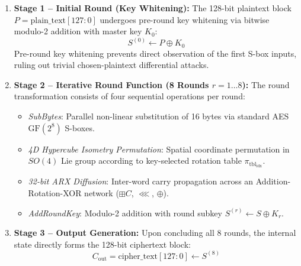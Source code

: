 \documentclass[10pt,twocolumn]{article}
\begin{document}
\begin{enumerate}
    \item \textbf{Stage 1 -- Initial Round (Key Whitening):} The 128-bit plaintext block $P = \text{plain\_text}[127:0]$ undergoes pre-round key whitening via bitwise modulo-2 addition with master key $K_0$:
    \begin{equation}
        S^{(0)} \leftarrow P \oplus K_0
    \end{equation}
    Pre-round key whitening prevents direct observation of the first S-box inputs, ruling out trivial chosen-plaintext differential attacks.
    
    \item \textbf{Stage 2 -- Iterative Round Function (8 Rounds $r = 1 \dots 8$):} The round transformation consists of four sequential operations per round:
    \begin{itemize}
        \item \emph{SubBytes}: Parallel non-linear substitution of 16 bytes via standard AES $\text{GF}(2^8)$ S-boxes.
        \item \emph{4D Hypercube Isometry Permutation}: Spatial coordinate permutation in $SO(4)$ Lie group according to key-selected rotation table $\pi_{\text{tbl}_{\text{idx}}}$.
        \item \emph{32-bit ARX Diffusion}: Inter-word carry propagation across an Addition-Rotation-XOR network ($\boxplus C$, $\lll$, $\oplus$).
        \item \emph{AddRoundKey}: Modulo-2 addition with round subkey $S^{(r)} \leftarrow S \oplus K_r$.
    \end{itemize}
    
    \item \textbf{Stage 3 -- Output Generation:} Upon concluding all 8 rounds, the internal state directly forms the 128-bit ciphertext block:
    \begin{equation}
        C_{\text{out}} = \text{cipher\_text}[127:0] \leftarrow S^{(8)}
    \end{equation}
\end{enumerate}
\end{document}
